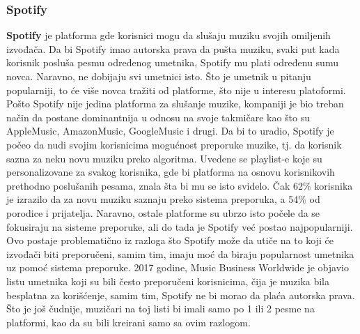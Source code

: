 \documentclass[a4paper]{article}
\begin{document}
{\subsubsection{Spotify}
\textbf{Spotify} je platforma gde korisnici mogu da slušaju muziku svojih omiljenih izvođača.  Da bi Spotify imao autorska prava da pušta muziku, svaki put kada korisnik posluša pesmu određenog umetnika, Spotify mu plati određenu sumu novca. Naravno, ne dobijaju svi umetnici isto. Što je umetnik u pitanju popularniji, to će više novca tražiti od platforme, što nije u interesu platoformi. 
\newline
Pošto Spotify nije jedina platforma za slušanje muzike, kompaniji je bio treban način da postane dominantnija u odnosu na svoje takmičare kao što su AppleMusic, AmazonMusic, GoogleMusic i drugi. Da bi to uradio, Spotify je počeo da nudi svojim korisnicima mogućnost preporuke muzike, tj. da korisnik sazna za neku novu muziku preko algoritma. Uvedene se playlist-e koje su personalizovane za svakog korisnika, gde bi platforma na osnovu korisnikovih prethodno poslušanih pesama, znala šta bi mu se isto svidelo. 
Čak 62\% korisnika  je izrazilo da za novu muziku saznaju preko sistema preporuka, a 54\% od porodice i prijatelja. Naravno, ostale platforme su ubrzo isto počele da se fokusiraju na sisteme preporuke, ali do tada je Spotify već postao najpopularniji. 
\newline
Ovo postaje problematično iz razloga što Spotify može da utiče na to koji će izvođači biti preporučeni, samim tim, imaju moć da biraju popularnost umetnika uz pomoć sistema preporuke. 2017 godine, Music Business Worldwide je objavio listu umetnika koji su bili često preporučeni korisnicima, čija je muzika bila besplatna za korišćenje, samim tim, Spotify ne bi morao da plaća autorska prava. Što je još čudnije, muzičari na toj listi bi imali samo po 1 ili 2 pesme na platformi, kao da su bili kreirani samo sa ovim razlogom. 

 

}
\end{document}
